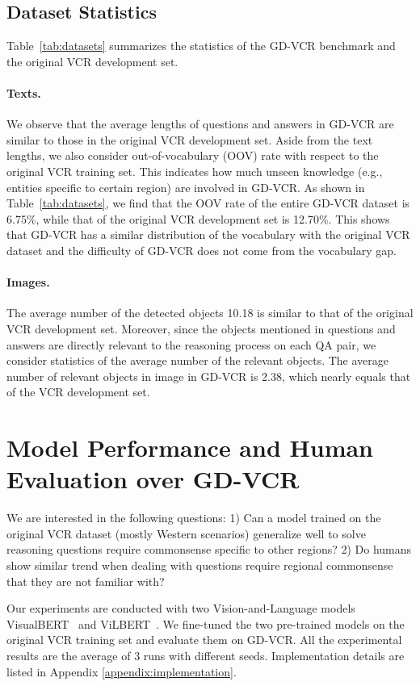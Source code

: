 \documentclass[11pt]{article}
\begin{document}
\subsection{Dataset Statistics}
Table~\ref{tab:datasets} summarizes the statistics of the GD-VCR benchmark and the original VCR development set.

\paragraph{Texts.} We observe that the average lengths of questions and answers in GD-VCR are similar to those in the original VCR development set. Aside from the text lengths, we also consider out-of-vocabulary (OOV) rate with respect to the original VCR training set. This indicates how much unseen knowledge (e.g., entities specific to certain region) are involved in GD-VCR.
As shown in Table~\ref{tab:datasets}, we find that the OOV rate of the entire GD-VCR dataset is 6.75\%, while that of the original VCR development set is 12.70\%. This shows that GD-VCR has a similar distribution of the vocabulary with the original VCR dataset and the difficulty of GD-VCR does not come from the vocabulary gap. 

\paragraph{Images.}  The average number of the detected objects 10.18 is similar to that of the original VCR development set. Moreover, since the objects mentioned in questions and answers are directly relevant to the reasoning process on each QA pair, we consider statistics of the average number of the relevant objects. The average number of relevant objects in image in GD-VCR is 2.38, which nearly equals that of the VCR development set.

\section{Model Performance and Human Evaluation over \textbf{GD-VCR}}
We are interested in the following questions: 1) Can a model trained on the original VCR dataset (mostly Western scenarios) generalize well to solve reasoning questions require commonsense specific to other regions? 2) Do humans show similar trend when dealing with questions require regional commonsense that they are not familiar with? 

Our experiments are conducted with two Vision-and-Language models VisualBERT~\cite{li2019visualbert} and ViLBERT~\cite{Lu2019ViLBERTPT}. We fine-tuned the two pre-trained models on the original VCR training set and evaluate them on GD-VCR. All the experimental results are the average of 3 runs with different seeds. Implementation details are listed in Appendix \ref{appendix:implementation}.
\end{document}
